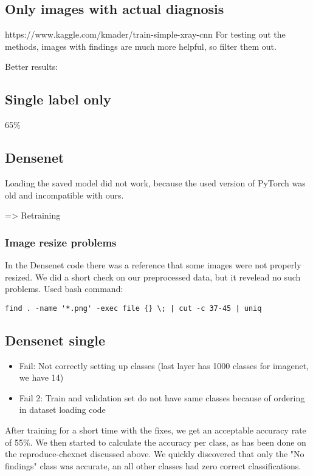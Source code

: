 \subsection{Only images with actual diagnosis}
https://www.kaggle.com/kmader/train-simple-xray-cnn 
For testing out the methods, images with findings are much more helpful, so filter them out.

Better results:


\subsection{Single label only}
65\%

\subsection{Densenet}

Loading the saved model did not work, because the used version of PyTorch was old and incompatible with ours.

=> Retraining

\subsubsection{Image resize problems}
In the Densenet code there was a reference that some images were not properly resized. We did a short check on our preprocessed data, but it revelead no such problems. Used bash command:

\begin{verbatim}
find . -name '*.png' -exec file {} \; | cut -c 37-45 | uniq
\end{verbatim}

\subsection{Densenet single}
\begin{itemize}
    \item Fail: Not correctly setting up classes (last layer has 1000 classes for imagenet, we have 14)
    \item Fail 2: Train and validation set do not have same classes because of ordering in dataset loading code
\end{itemize}

After training for a short time with the fixes, we get an acceptable accuracy rate of 55\%. We then started to calculate the accuracy per class, as has been done on the reproduce-chexnet discussed above. We quickly discovered that only the "No findings" class was accurate, an all other classes had zero correct classifications.

